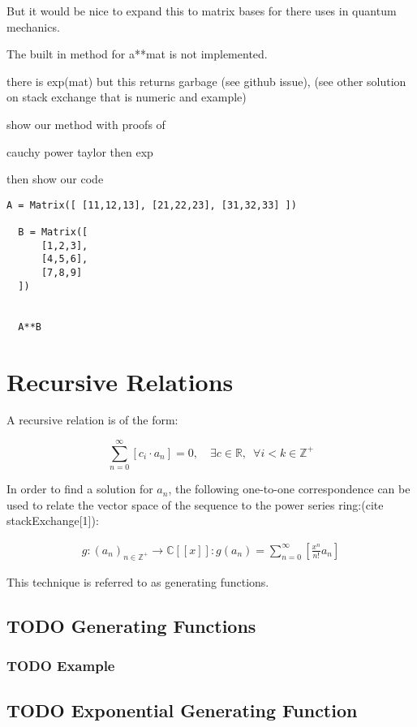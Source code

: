 \documentclass[11pt]{article}
\begin{document}
But it would be nice to expand this to matrix bases for there uses in quantum
mechanics.

The built in method for a**mat is not implemented.

there is exp(mat) but this returns garbage (see github issue), (see other
solution on stack exchange that is numeric and example)

show our method with proofs of

cauchy power taylor then exp

then show our code

\begin{verbatim}
A = Matrix([ [11,12,13], [21,22,23], [31,32,33] ])

  B = Matrix([
      [1,2,3],
      [4,5,6],
      [7,8,9]
  ])


  A**B
\end{verbatim}
\section{Recursive Relations}
\label{sec:orga125b82}
A recursive relation is of the form:

$$
\sum^{\infty}_{n= 0}   \left[ c_i \cdot  a_n \right] = 0, \quad \exists c \in
\mathbb{R}, \enspace \forall i<k\in\mathbb{Z}^+
$$

In order to find a solution for \(a_n\), the following one-to-one
correspondence can be used to relate the vector space of the sequence to the
power series ring:(cite stackExchange[1]):

$$\begin{aligned}
g: \left( a_n \right)_{n\in\mathbb{Z}^+} \rightarrow \mathbb{C}\left[ \left[ x \right]  \right]: g\left( a_n \right) = \sum^{\infty}_{n= 0}\left[ \frac{x^n}{n!} a_n \right] 
\end{aligned}$$

This technique is referred to as generating functions.
\cite{lehmanReadingsMathematicsComputer2010}


\subsection{{\bfseries\sffamily TODO} Generating Functions}
\label{sec:org0dcad4d}
\subsubsection{{\bfseries\sffamily TODO} Example}
\label{sec:orga66fb02}
\subsection{{\bfseries\sffamily TODO} Exponential Generating Function}
\label{sec:org3d2247c}
\end{document}
